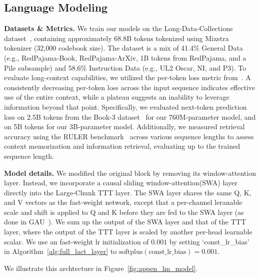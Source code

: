 \documentclass{article}
\begin{document}
\subsection{Language Modeling}\label{sec:appen_exp_language}

\noindent\textbf{Datasets \& Metrics.}
We train our models on the Long-Data-Collections dataset~\cite{long_data_collection}, containing approximately 68.8B tokens tokenized using Mixstra tokenizer (32,000 codebook size).
The dataset is a mix of 41.4\% General Data (e.g., RedPajama-Book, RedPajama-ArXiv, 1B tokens from RedPajama, and a Pile subsample) and 58.6\% Instruction Data (e.g., UL2 Oscar, NI, and P3). 
To evaluate long-context capabilities, we utilized the per-token loss metric from~\cite{linforgetting}. A consistently decreasing per-token loss across the input sequence indicates effective use of the entire context, while a plateau suggests an inability to leverage information beyond that point. Specifically, we evaluated next-token prediction loss on 2.5B tokens from the Book-3 dataset~\cite{gao2020pile} for our 760M-parameter model, and on 5B tokens for our 3B-parameter model. Additionally, we measured retrieval accuracy using the RULER benchmark~\cite{hsiehruler} across various sequence lengths to assess context memorization and information retrieval, evaluating up to the trained sequence length.

\noindent\textbf{Model details.}
We modified the original \methodname{} block by removing its window-attention layer. Instead, we incorporate a causal sliding window-attention(SWA) layer directly into the Large-Chunk TTT layer. The SWA layer shares the same Q, K, and V vectors
as the fast-weight network, except that a per-channel leranable scale and shift is applied  
to Q and K before they are fed to the SWA layer (as done in GAU~\cite{hua2022transformer}).  We sum up the output of the SWA layer and that of the TTT layer, where the output of the TTT layer is scaled by 
another per-head learnable scalar. 
We use an fast-weight lr initialization of $0.001$ by setting `const\_lr\_bias' in Algorithm~\ref{alg:full_lact_layer} to $\mathrm{softplus}(\text{const\_lr\_bias}) = 0.001$.

We illustrate this archtecture in Figure~\ref{fig:appen_lm_model}. 
\end{document}
